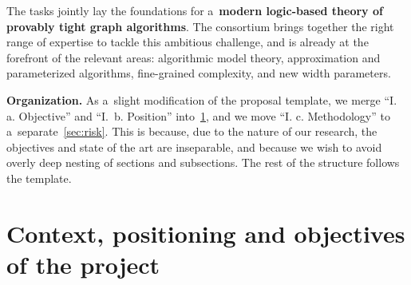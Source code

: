 \documentclass[a4paper,11pt]{article}
\newcommand{\michael}[1]{\noindent{\bf {\color{orange!80!black}{\sc Michael:}  #1}}}
\newcommand{\giannos}[1]{\noindent{\bf {\color{violet}{\sc Giannos:}  #1}}}
\begin{document}
The tasks jointly lay the foundations for a~\textbf{modern logic-based theory of provably tight graph algorithms}.
The consortium brings together the right range of expertise to tackle this ambitious challenge, and is already at the forefront of the relevant areas: algorithmic model theory, approximation and parameterized algorithms, fine-grained complexity, and new width parameters.


\medskip

\textbf{Organization.}
As a~slight modification of the proposal template, we merge ``I. a. Objective'' and ``I.~b. Position'' into~\cref{sec:objectives}, and we move ``I. c. Methodology'' to a~separate~\cref{sec:risk}.
This is because, due to the nature of our research, the objectives and state of the art are inseparable, and because we wish to avoid overly deep nesting of sections and subsections.
The rest of the structure follows the template.

\section{Context, positioning and objectives of the project}\label{sec:objectives}

\end{document}

